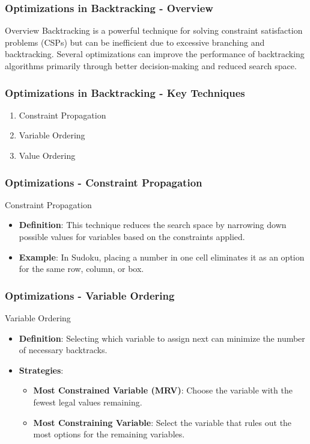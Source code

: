 \documentclass[aspectratio=169]{beamer}
\begin{document}
\begin{frame}[fragile]
    \frametitle{Optimizations in Backtracking - Overview}
    \begin{block}{Overview}
        Backtracking is a powerful technique for solving constraint satisfaction problems (CSPs) but can be inefficient due to excessive branching and backtracking. Several optimizations can improve the performance of backtracking algorithms primarily through better decision-making and reduced search space.
    \end{block}
\end{frame}

\begin{frame}[fragile]
    \frametitle{Optimizations in Backtracking - Key Techniques}
    \begin{enumerate}
        \item Constraint Propagation
        \item Variable Ordering
        \item Value Ordering
    \end{enumerate}
\end{frame}

\begin{frame}[fragile]
    \frametitle{Optimizations - Constraint Propagation}
    \begin{block}{Constraint Propagation}
        \begin{itemize}
            \item \textbf{Definition}: This technique reduces the search space by narrowing down possible values for variables based on the constraints applied.
            \item \textbf{Example}: In Sudoku, placing a number in one cell eliminates it as an option for the same row, column, or box.
        \end{itemize}
    \end{block}
\end{frame}

\begin{frame}[fragile]
    \frametitle{Optimizations - Variable Ordering}
    \begin{block}{Variable Ordering}
        \begin{itemize}
            \item \textbf{Definition}: Selecting which variable to assign next can minimize the number of necessary backtracks.
            \item \textbf{Strategies}:
            \begin{itemize}
                \item \textbf{Most Constrained Variable (MRV)}: Choose the variable with the fewest legal values remaining.
                \item \textbf{Most Constraining Variable}: Select the variable that rules out the most options for the remaining variables.
            \end{itemize}
        \end{itemize}
    \end{block}
\end{frame}
\end{document}
